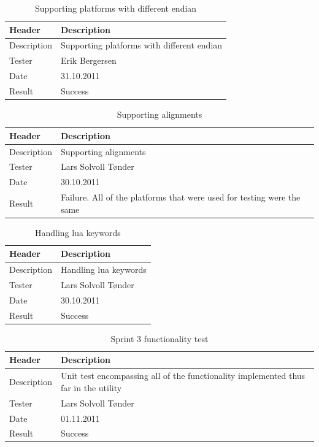 \begin{table}[!htb] \footnotesize \center
\caption{Supporting platforms with different \gls{endian} \label{tab:sp3TID21}}
\begin{tabular}{l l}
	\toprule
	Header & Description \\
	\midrule
	Description & Supporting platforms with different \gls{endian} \\
	Tester & Erik Bergersen\\
	Date & 31.10.2011\\
	Result & Success\\
	\bottomrule
\end{tabular}
\end{table}

\begin{table}[!htb] \footnotesize \center
\caption{Supporting alignments \label{tab:sp3TID22}}
\begin{tabular}{l l}
	\toprule
	Header & Description \\
	\midrule
	Description & Supporting alignments \\
	Tester & Lars Solvoll Tønder\\
	Date & 30.10.2011\\
	Result & Failure. All of the platforms that were used for testing were the same\\
	\bottomrule
\end{tabular}
\end{table}

\begin{table}[!htb] \footnotesize \center
\caption{Handling \Gls{lua} keywords \label{tab:sp3TID23}}
\begin{tabular}{l l}
	\toprule
	Header & Description \\
	\midrule
	Description & Handling \Gls{lua} keywords \\
	Tester & Lars Solvoll Tønder\\
	Date & 30.10.2011\\
	Result & Success\\
	\bottomrule
\end{tabular}
\end{table}

\begin{table}[!htb] \footnotesize \center
\caption{Sprint 3 functionality test \label{tab:sp3TID24}}
\begin{tabular}{l l}
	\toprule
	Header & Description \\
	\midrule
	Description & Unit test encompassing all of the functionality implemented thus far in the utility \\
	Tester & Lars Solvoll Tønder\\
	Date & 01.11.2011\\
	Result & Success\\
	\bottomrule
\end{tabular}
\end{table}

